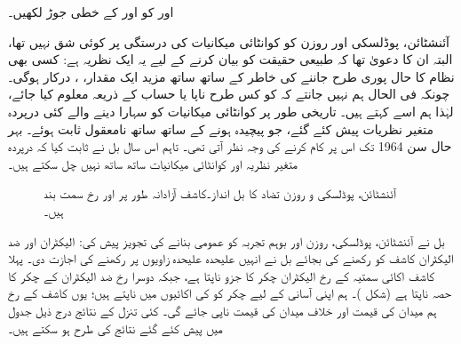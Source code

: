    اور  کو  اور  کے خطی جوڑ لکھیں۔


آئنشٹائن، پوڈلسکی اور روزن کو کوانٹائی میکانیات کی درستگی پر کوئی شق نہیں تھا،  البتہ ان کا دعویٰ  تھا کہ  طبیعی حقیقت کو بیان کرنے کے لیے یہ ایک نظریہ ہے:   کسی بھی نظام کا حال پوری طرح جاننے کی خاطر  کے ساتھ ساتھ  مزید  ایک مقدار،  ،  درکار ہوگی۔ چونکہ فی الحال ہم نہیں جانتے کہ  کو کس طرح ناپا یا حساب کے ذریعہ معلوم کیا جائے،  لہٰذا ہم اسے    کہتے ہیں۔  تاریخی طور پر  کوانٹائی میکانیات کو سہارا دینے والے کئی درپردہ متغیر نظریات پیش کئے گئے،  جو پیچیدہ ہونے کے ساتھ ساتھ نامعقول ثابت ہوئے۔  بہر حال سن \num{1964} تک اس پر کام کرنے کی وجہ نظر آتی تھی۔  تاہم اس سال  بل نے ثابت کیا کہ درپردہ متغیر نظریہ اور کوانٹائی میکانیات ساتھ ساتھ نہیں چل سکتے ہیں۔

\begin{figure}
\centering
{}
\caption{آئنشٹائن، پوڈلسکی و  روزن  تضاد کا بل  انداز۔کاشف آزادانہ طور پر  اور  رخ سمت بند ہیں۔}
\label{شکل_بکھراو_بل_انداز}
\end{figure}


بل نے آئنشٹائن،  پوڈلسکی، روزن اور  بوہم تجربہ کو عمومی بنانے کی  تجویز پیش کی:  الیکٹران اور ضد الیکٹران کاشف کو    رکھنے کی بجائے بل نے انہیں علیحدہ علیحدہ زاویوں پر رکھنے کی اجازت دی۔ پہلا کاشف اکائی سمتیہ   کے رخ الیکٹران چکر کا جزو  ناپتا ہے،  جبکہ دوسرا   رخ ضد الیکٹران کے چکر کا حصہ ناپتا ہے   (شکل )۔ ہم اپنی آسانی کے لیے چکر کو  کی اکائیوں میں ناپتے ہیں؛  یوں کاشف کے رخ ہم میدان کی قیمت  اور خلاف میدان کی قیمت  ناپی جائے گی۔ کئی  تنزل کے نتائج درج ذیل جدول میں پیش کئے گئے نتائج کی طرح ہو سکتے ہیں۔

